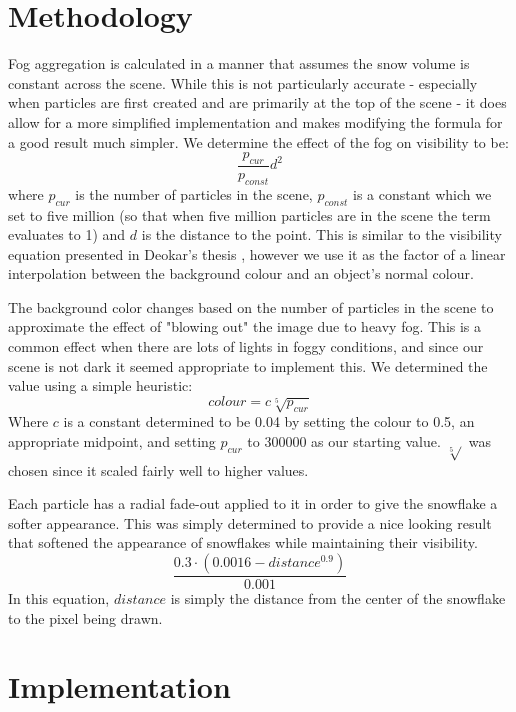 \documentclass[conference]{acmsiggraph}
\begin{document}
\section{Methodology}
Fog aggregation is calculated in a manner that assumes the snow volume is constant across the scene. While this is not particularly accurate - especially when particles are first created and are primarily at the top of the scene - it does allow for a more simplified implementation and makes modifying the formula for a good result much simpler. We determine the effect of the fog on visibility to be:
\begin{equation} \label{eq:fog}
\frac{p_{cur}}{p_{const}}d^2
\end{equation}
where $p_{cur}$ is the number of particles in the scene, $p_{const}$ is a constant which we set to five million (so that when five million particles are in the scene the term evaluates to 1) and $d$ is the distance to the point. This is similar to the visibility equation presented in Deokar's thesis \cite{deokar09}, however we use it as the factor of a linear interpolation between the background colour and an object's normal colour.

The background color changes based on the number of particles in the scene to approximate the effect of "blowing out" the image due to heavy fog. This is a common effect when there are lots of lights in foggy conditions, and since our scene is not dark it seemed appropriate to implement this. We determined the value using a simple heuristic:
\begin{equation} \label{eq:bgcolor}
colour = c\sqrt[5]{p_{cur}}
\end{equation}
Where $c$ is a constant determined to be 0.04 by setting the colour to 0.5, an appropriate midpoint, and setting $p_{cur}$ to 300000 as our starting value. $\sqrt[5]{}$ was chosen since it scaled fairly well to higher values.

Each particle has a radial fade-out applied to it in order to give the snowflake a softer appearance. This was simply determined to provide a nice looking result that softened the appearance of snowflakes while maintaining their visibility.
\begin{equation} \label{eq:alpha}
\frac{0.3 \cdot (0.0016 - distance^{0.9})} {0.001}
\end{equation}
In this equation, $distance$ is simply the distance from the center of the snowflake to the pixel being drawn.

\section{Implementation}
\end{document}
